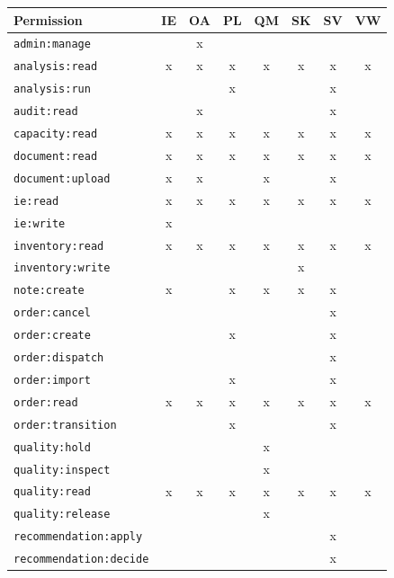 \documentclass[11pt,a4paper]{article}
\begin{document}
\begin{table}[h]
\centering\small
\begin{tabular}{@{}lccccccc@{}}
\toprule
\textbf{Permission} & IE & OA & PL & QM & SK & SV & VW\\
\midrule
\texttt{admin:manage}           &   & x &   &   &   &   &  \\
\texttt{analysis:read}          & x & x & x & x & x & x & x\\
\texttt{analysis:run}           &   &   & x &   &   & x &  \\
\texttt{audit:read}             &   & x &   &   &   & x &  \\
\texttt{capacity:read}          & x & x & x & x & x & x & x\\
\texttt{document:read}          & x & x & x & x & x & x & x\\
\texttt{document:upload}        & x & x &   & x &   & x &  \\
\texttt{ie:read}                & x & x & x & x & x & x & x\\
\texttt{ie:write}               & x &   &   &   &   &   &  \\
\texttt{inventory:read}         & x & x & x & x & x & x & x\\
\texttt{inventory:write}        &   &   &   &   & x &   &  \\
\texttt{note:create}            & x &   & x & x & x & x &  \\
\texttt{order:cancel}           &   &   &   &   &   & x &  \\
\texttt{order:create}           &   &   & x &   &   & x &  \\
\texttt{order:dispatch}         &   &   &   &   &   & x &  \\
\texttt{order:import}           &   &   & x &   &   & x &  \\
\texttt{order:read}             & x & x & x & x & x & x & x\\
\texttt{order:transition}       &   &   & x &   &   & x &  \\
\texttt{quality:hold}           &   &   &   & x &   &   &  \\
\texttt{quality:inspect}        &   &   &   & x &   &   &  \\
\texttt{quality:read}           & x & x & x & x & x & x & x\\
\texttt{quality:release}        &   &   &   & x &   &   &  \\
\texttt{recommendation:apply}   &   &   &   &   &   & x &  \\
\texttt{recommendation:decide}  &   &   &   &   &   & x &  \\
\bottomrule
\end{tabular}
\end{table}
\end{document}
